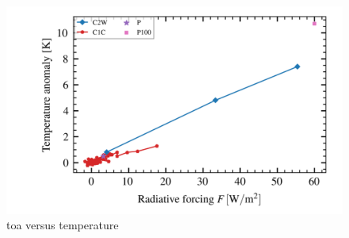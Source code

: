 \documentclass[twocol]{ametsocV5}
\begin{document}
\begin{figure}
  \begin{center}
    \includegraphics[width=0.95\linewidth]{figures/toa_vs_temperature.png}
  \end{center}
  \caption{\acrshort{toa} versus temperature}%
  \label{fig:toa_vs_temp}
\end{figure}

\clearpage




\end{document}
